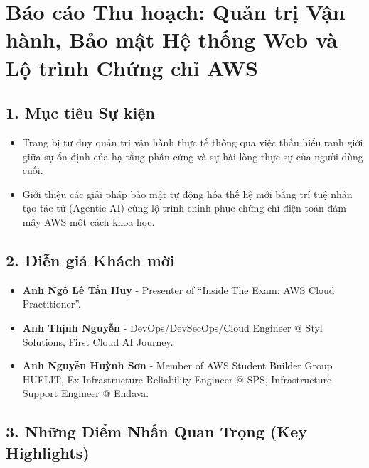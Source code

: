 \hypertarget{buxe1o-cuxe1o-thu-houx1ea1ch-quux1ea3n-trux1ecb-vux1eadn-huxe0nh-bux1ea3o-mux1eadt-hux1ec7-thux1ed1ng-web-vuxe0-lux1ed9-truxecnh-chux1ee9ng-chux1ec9-aws}{%
\section{Báo cáo Thu hoạch: Quản trị Vận hành, Bảo mật Hệ thống Web và
Lộ trình Chứng chỉ
AWS}}

\hypertarget{mux1ee5c-tiuxeau-sux1ef1-kiux1ec7n}{%
\subsection{1. Mục tiêu Sự
kiện}}

\begin{itemize}
\tightlist
\item
  Trang bị tư duy quản trị vận hành thực tế thông qua việc thấu hiểu
  ranh giới giữa sự ổn định của hạ tầng phần cứng và sự hài lòng thực sự
  của người dùng cuối.
\item
  Giới thiệu các giải pháp bảo mật tự động hóa thế hệ mới bằng trí tuệ
  nhân tạo tác tử (Agentic AI) cùng lộ trình chinh phục chứng chỉ điện
  toán đám mây AWS một cách khoa học.
\end{itemize}

\hypertarget{diux1ec5n-giux1ea3-khuxe1ch-mux1eddi}{%
\subsection{2. Diễn giả Khách
mời}}

\begin{itemize}
\tightlist
\item
  \textbf{Anh Ngô Lê Tấn Huy} - Presenter of ``Inside The Exam: AWS
  Cloud Practitioner''.
\item
  \textbf{Anh Thịnh Nguyễn} - DevOps/DevSecOps/Cloud Engineer @ Styl
  Solutions, First Cloud AI Journey.
\item
  \textbf{Anh Nguyễn Huỳnh Sơn} - Member of AWS Student Builder Group
  HUFLIT, Ex Infrastructure Reliability Engineer @ SPS, Infrastructure
  Support Engineer @ Endava.
\end{itemize}

\hypertarget{nhux1eefng-ux111iux1ec3m-nhux1ea5n-quan-trux1ecdng-key-highlights}{%
\subsection{3. Những Điểm Nhấn Quan Trọng (Key
Highlights)}}

